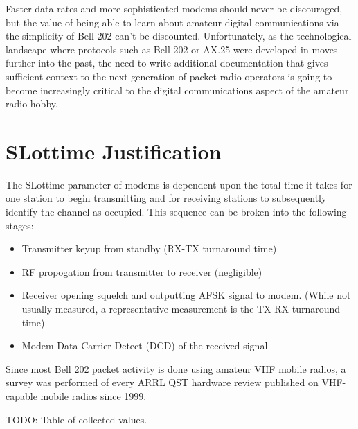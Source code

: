 \documentclass[12pt,letterpaper]{article}
\begin{document}
Faster data rates and more sophisticated modems should never be discouraged,
but the value of being able to learn about amateur digital communications 
via the simplicity of Bell 202 can't be discounted.
Unfortunately, as the technological landscape where 
protocols such as Bell 202 or AX.25 were developed in moves further into the past,
the need to write additional documentation that gives sufficient context to 
the next generation of packet radio operators is going to become increasingly 
critical to the digital communications aspect of the amateur radio hobby.


\appendix
\section{SLottime Justification}
\label{vhftxrx}

The SLottime parameter of modems is dependent upon the total time
it takes for one station to begin transmitting and for receiving stations
to subsequently identify the channel as occupied.
This sequence can be broken into the following stages:
\begin{itemize}
	\item Transmitter keyup from standby (RX-TX turnaround time)
	\item RF propogation from transmitter to receiver (negligible)
	\item Receiver opening squelch and outputting AFSK signal to modem. 
		(While not usually measured, a representative measurement is
		the TX-RX turnaround time)
	\item Modem Data Carrier Detect (DCD) of the received signal
\end{itemize}

Since most Bell 202 packet activity is done using amateur VHF mobile radios,
a survey was performed of every ARRL QST hardware review published on VHF-capable
mobile radios since 1999.

TODO: Table of collected values.
\end{document}
